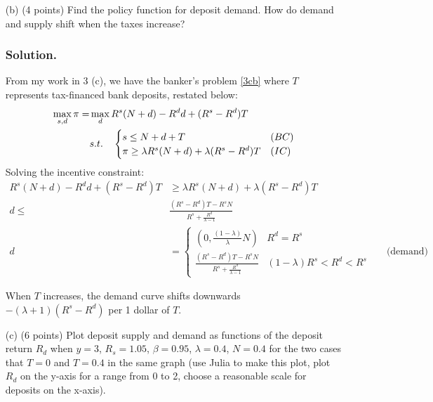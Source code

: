 \documentclass[12pt]{article}
\begin{document}
\begin{enumerate}
\begin{enumerate}
    
    
    
        \item[(b)] {(4 points)} Find the policy function for deposit demand. How do demand and supply shift when the taxes increase?
        \subsubsection*{Solution.}

        From my work in 3 (c), we have the banker's problem  \eqref{3cb} where $T$ represents tax-financed bank deposits, restated below: 
        \begin{align*}
                \max_{s,d}\pi =&\max_{d}  R^s(N+d) - R^dd + (R^s-R^d)T  
                \\ & s.t. \quad \begin{cases}
                    s \leq N + d + T & (BC)
                    \\ \pi \geq \lambda R^s(N+d) + \lambda (R^s - R^d)T & (IC)
                \end{cases}\notag 
        \end{align*}
        Solving the incentive constraint: 
        \begin{align*}
             R^s(N+d) - R^dd + (R^s-R^d)T&\geq \lambda R^s(N+d) + \lambda (R^s - R^d)T
            \\ d \leq & \frac{(R^{s}-R^{d})T-R^{s}N}{R^{s}+\frac{R^{d}}{\lambda-1}}
            \\d &= \begin{cases}
                 \left(0, \frac{(1-\lambda)}{\lambda}N\right) & R^d = R^s 
                 \\ \frac{(R^{s}-R^{d})T-R^{s}N}{R^{s}+\frac{R^{d}}{\lambda-1}} & (1-\lambda)R^s < R^d < R^s
             \end{cases} && \text{(demand)}
        \end{align*}

        When $T$ increases, the demand curve shifts downwards $-\left(\lambda+1\right)(R^{s}-R^{d})$ per 1 dollar of $T$. 

        \bigskip
        \item[(c)] {(6 points)} Plot deposit supply and demand as functions of the deposit return $R_d$ when $y = 3$, $R_s = 1.05$, $\beta = 0.95$, $\lambda = 0.4$, $N = 0.4$ for the two cases that $T = 0$ and $T = 0.4$ in the same graph (use Julia to make this plot, plot $R_d$ on the y-axis for a range from 0 to 2, choose a reasonable scale for deposits on the x-axis).

\end{enumerate}
\end{enumerate}
\end{document}
